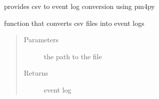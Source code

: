 \documentclass[letterpaper,10pt,english]{sphinxmanual}
\begin{document}
\begin{fulllineitems}
\label{\detokenize{eventLogConverter:eventLogConverter.concreteImplementation.CSVFileConverter}}
provides csv to event log conversion using pm4py

\begin{fulllineitems}
\label{\detokenize{eventLogConverter:eventLogConverter.concreteImplementation.CSVFileConverter.convert}}
function that converts csv files into event logs
\begin{quote}\begin{description}
\item[{Parameters}] \leavevmode
{} \textendash{} the path to the file

\item[{Returns}] \leavevmode
event log

\end{description}\end{quote}

\end{fulllineitems}


\end{fulllineitems}

\end{document}
